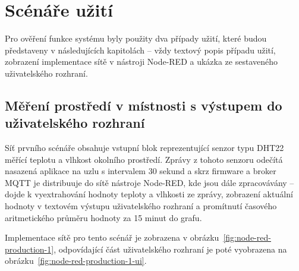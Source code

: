\section{Scénáře užití}\label{sec:scenare-uziti}

Pro ověření funkce systému byly použity dva případy užití, které budou představeny v následujících kapitolách -- vždy
textový popis případu užití, zobrazení implementace sítě v nástroji Node-RED a ukázka ze sestaveného uživatelského
rozhraní.

\subsection{Měření prostředí v místnosti s výstupem do uživatelského rozhraní}\label{subsec:scenar-1}

Síť prvního scénáře obsahuje vstupní blok reprezentující senzor typu DHT22 měřící teplotu a vlhkost okolního prostředí.
Zprávy z tohoto senzoru odečítá nasazená aplikace na uzlu s intervalem 30 sekund a skrz firmware a broker MQTT je
distribuuje do sítě nástroje Node-RED, kde jsou dále zpracovávány -- dojde
k vyextrahování hodnoty teploty a vlhkosti ze zprávy, zobrazení aktuální hodnoty v textovém výstupu uživatelského
rozhraní a promítnutí časového aritmetického průměru hodnoty za 15 minut do grafu.

Implementace sítě pro tento scénář je zobrazena v obrázku~\ref{fig:node-red-production-1}, odpovídající část
uživatelského rozhraní je poté vyobrazena na obrázku~\ref{fig:node-red-production-1-ui}.

